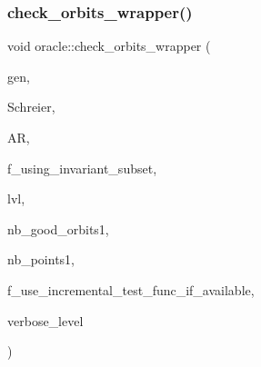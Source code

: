 \mbox{\label{classoracle_ad44ea4b6d3c607879221f41944d02f73}} 
\subsubsection{\texorpdfstring{check\+\_\+orbits\+\_\+wrapper()}{check\_orbits\_wrapper()}}
{\footnotesize\ttfamily void oracle\+::check\+\_\+orbits\+\_\+wrapper (\begin{DoxyParamCaption}\item[{\mbox{\hyperlink{classgenerator}{generator}} $\ast$}]{gen,  }\item[{\mbox{\hyperlink{classschreier}{schreier}} \&}]{Schreier,  }\item[{\mbox{\hyperlink{classaction}{action}} \&}]{AR,  }\item[{\mbox{\hyperlink{galois_8h_a09fddde158a3a20bd2dcadb609de11dc}{I\+NT}}}]{f\+\_\+using\+\_\+invariant\+\_\+subset,  }\item[{\mbox{\hyperlink{galois_8h_a09fddde158a3a20bd2dcadb609de11dc}{I\+NT}}}]{lvl,  }\item[{\mbox{\hyperlink{galois_8h_a09fddde158a3a20bd2dcadb609de11dc}{I\+NT}} \&}]{nb\+\_\+good\+\_\+orbits1,  }\item[{\mbox{\hyperlink{galois_8h_a09fddde158a3a20bd2dcadb609de11dc}{I\+NT}} \&}]{nb\+\_\+points1,  }\item[{\mbox{\hyperlink{galois_8h_a09fddde158a3a20bd2dcadb609de11dc}{I\+NT}}}]{f\+\_\+use\+\_\+incremental\+\_\+test\+\_\+func\+\_\+if\+\_\+available,  }\item[{\mbox{\hyperlink{galois_8h_a09fddde158a3a20bd2dcadb609de11dc}{I\+NT}}}]{verbose\+\_\+level }\end{DoxyParamCaption})}

\mbox{\label{classoracle_a03cf03f7298da4a05fd1182893c74b4b}} 
